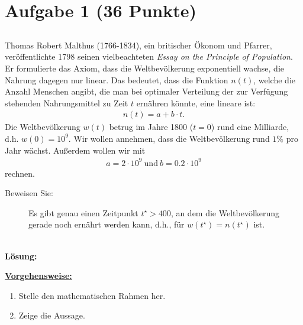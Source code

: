 \vspace{1cm}
\renewcommand{\labelenumi}{\theenumi.}
\section*{Aufgabe 1 (36 Punkte)}
\vspace{0.4cm}
\subsection*{} 
Thomas Robert Malthus (1766-1834), ein britischer Ökonom und Pfarrer, veröffentlichte
1798 seinen vielbeachteten \textit{Essay on the Principle of Population}.
Er formulierte das Axiom, dass die Weltbevölkerung exponentiell wachse, die Nahrung dagegen nur linear. 
Das bedeutet, dass die Funktion $ n(t) $, welche die Anzahl Menschen angibt, die man bei optimaler Verteilung der zur Verfügung stehenden Nahrungsmittel zu Zeit $ t $ ernähren könnte, eine lineare ist:
\begin{align*}
	n(t) = a + b \cdot t.
\end{align*}
Die Weltbevölkerung $ w(t) $ betrug im Jahre 1800 ($ t= 0 $) rund eine Milliarde, d.h. $ w(0) = 10^9 $.
Wir wollen annehmen, dass die Weltbevölkerung rund $ 1\% $ pro Jahr wächst.
Außerdem wollen wir mit
\begin{align*}
	a = 2 \cdot 10^9 \ \textrm{und} \ b = 0.2 \cdot 10^9
\end{align*}
rechnen.
\begin{description}
	\item[Beweisen Sie:] 
	Es gibt genau einen Zeitpunkt $ t^\star > 400 $, an dem die Weltbevölkerung gerade noch ernährt werden kann, d.h., für $ w(t^\star)  = n(t^\star )$ ist.
\end{description}  
\
\\
\textbf{Lösung:}
\begin{mdframed}
\underline{\textbf{Vorgehensweise:}}
\renewcommand{\labelenumi}{\theenumi.}
\begin{enumerate}
\item Stelle den mathematischen Rahmen her.
\item Zeige die Aussage.

\end{enumerate}
\end{mdframed}
